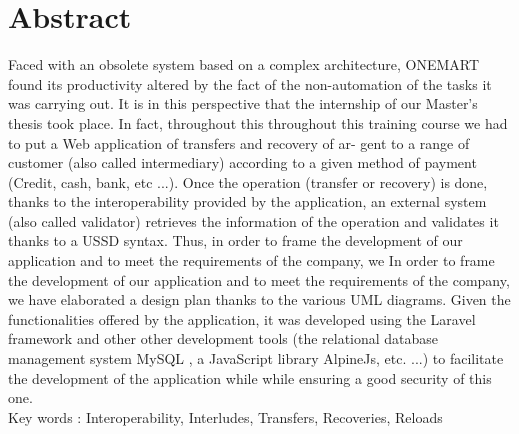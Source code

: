 \chapter*{Abstract}
\thispagestyle{empty}
	Faced with an obsolete system based on a complex architecture, ONEMART
	found its productivity altered by the fact of the non-automation of the tasks it was carrying out.
	It is in this perspective that the internship of our Master's thesis took place. In fact, throughout this
	throughout this training course we had to put a Web application of transfers and recovery of ar-
	gent to a range of customer (also called intermediary) according to a given method of payment (Credit,
	cash, bank, etc ...). Once the operation (transfer or recovery) is done, thanks to the
	interoperability provided by the application, an external system (also called validator)
	retrieves the information of the operation and validates it thanks to a USSD syntax.
	Thus, in order to frame the development of our application and to meet the requirements of the company, we
	In order to frame the development of our application and to meet the requirements of the company, we have elaborated a design plan thanks to the various UML diagrams. Given the
	functionalities offered by the application, it was developed using the Laravel framework and other
	other development tools (the relational database management system MySQL ,
	a JavaScript library AlpineJs, etc. ...) to facilitate the development of the application while
	while ensuring a good security of this one.\\
	
	Key words : Interoperability, Interludes, Transfers, Recoveries, Reloads